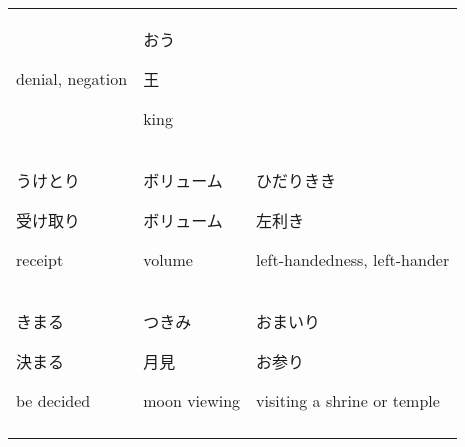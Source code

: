 \documentclass[12pt, a4j, landscape, dvipdfmx]{utarticle}
\begin{document}
\begin{minipage}[t][0pt]{\linewidth }
\begin{tabular}{||p{5.5cm}||p{5.5cm}||p{5.5cm}||}
\rule{0pt}{3ex} \hspace*{.425cm} {\small denial, negation}&\rule{0pt}{3ex} \hspace*{-.4cm} {\LARGE おう}\newline \rule{0pt}{3ex} \hspace*{.4cm} {\small 王}\newline \rule{0pt}{3ex} \hspace*{.425cm} {\small king}\tabularnewline \hhline{|:=::=::=:|} \rule{0pt}{3ex} \hspace*{-.4cm} {\LARGE うけとり}\newline \rule{0pt}{3ex} \hspace*{.4cm} {\small 受け取り}\newline \rule{0pt}{3ex} \hspace*{.425cm} {\small receipt}&\rule{0pt}{3ex} \hspace*{-.4cm} {\LARGE ボリューム}\newline \rule{0pt}{3ex} \hspace*{.4cm} {\small ボリューム}\newline \rule{0pt}{3ex} \hspace*{.425cm} {\small volume}&\rule{0pt}{3ex} \hspace*{-.4cm} {\LARGE ひだりきき}\newline \rule{0pt}{3ex} \hspace*{.4cm} {\small 左利き}\newline \rule{0pt}{3ex} \hspace*{.425cm} {\small left-handedness, left-hander}\tabularnewline \hhline{|:=::=::=:|} \rule{0pt}{3ex} \hspace*{-.4cm} {\LARGE きまる}\newline \rule{0pt}{3ex} \hspace*{.4cm} {\small 決まる}\newline \rule{0pt}{3ex} \hspace*{.425cm} {\small be decided}&\rule{0pt}{3ex} \hspace*{-.4cm} {\LARGE つきみ}\newline \rule{0pt}{3ex} \hspace*{.4cm} {\small 月見}\newline \rule{0pt}{3ex} \hspace*{.425cm} {\small moon viewing}&\rule{0pt}{3ex} \hspace*{-.4cm} {\LARGE おまいり}\newline \rule{0pt}{3ex} \hspace*{.4cm} {\small お参り}\newline \rule{0pt}{3ex} \hspace*{.425cm} {\small visiting a shrine or temple}\tabularnewline \hhline{|b:=:b:=:b:=:b|} 
        \end{tabular} 
    \end{minipage} 
\end{document}
